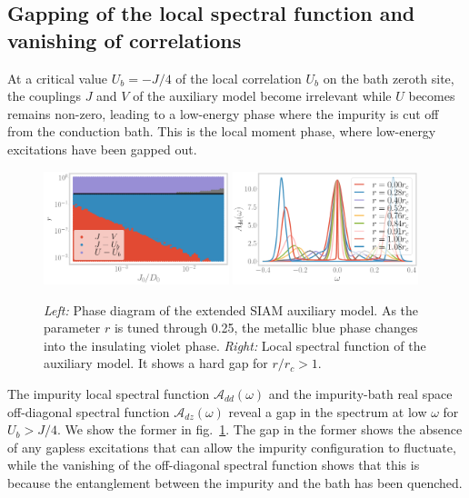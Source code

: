 \documentclass[reprint,hidelinks]{revtex4-2}
\begin{document}
\subsection{Gapping of the local spectral function and vanishing of correlations}
At a critical value \(U_b = -J/4\) of the local correlation \(U_b\) on the bath zeroth site, the couplings \(J\) and \(V\) of the auxiliary model become irrelevant while \(U\) becomes remains non-zero, leading to a low-energy phase where the impurity is cut off from the conduction bath. This is the local moment phase, where low-energy excitations have been gapped out.
\begin{figure}[htpb]
	\centering
	\includegraphics[width=0.48\textwidth]{phase-map-MIT.pdf}
	\includegraphics[width=0.48\textwidth]{spectral-function_dd.pdf}
	\caption{{\it Left:} Phase diagram of the extended SIAM auxiliary model. As the parameter \(r\) is tuned through 0.25, the metallic blue phase changes into the insulating violet phase. {\it Right:} Local spectral function of the auxiliary model. It shows a hard gap for \(r/r_c > 1\).}
	\label{spec_func_mit}
\end{figure}

The impurity local spectral function \(\mathcal{A}_{dd}(\omega)\) and the impurity-bath real space off-diagonal spectral function \(\mathcal{A}_{dz}(\omega)\) reveal a gap in the spectrum at low \(\omega\) for \(U_b > J/4\). We show the former in fig.~\ref{spec_func_mit}. The gap in the former shows the absence of any gapless excitations that can allow the impurity configuration to fluctuate, while the vanishing of the off-diagonal spectral function shows that this is because the entanglement between the impurity and the bath has been quenched. 
\end{document}
